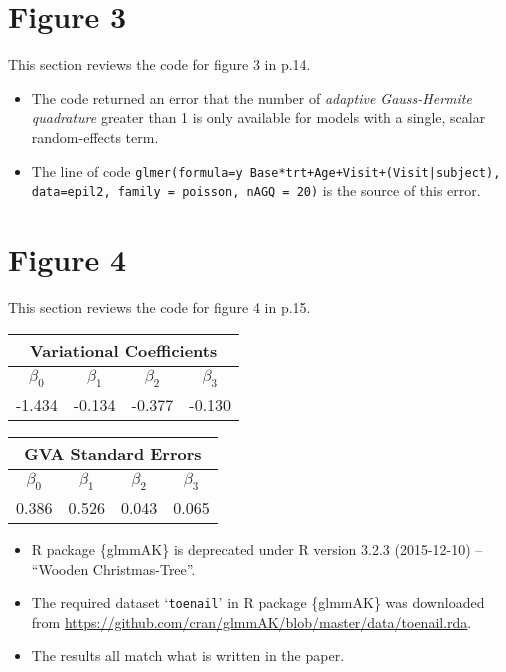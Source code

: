 \documentclass[11pt]{article}
\begin{document}
\section{Figure 3}
This section reviews the code for figure 3 in p.14.
\begin{itemize}
  \item The code returned an error that the number of \emph{adaptive Gauss-Hermite quadrature} greater than 1 is only available for models with a single, scalar random-effects term.
  \item The line of code \texttt{glmer(formula=y~Base*trt+Age+Visit+(Visit|subject), data=epil2, family = poisson, nAGQ = 20)} is the source of this error.
\end{itemize}


\section{Figure 4}
This section reviews the code for figure 4 in p.15.
\begin{table}[!htbp]
\centering
  \begin{tabular}{*4c}
    \toprule
    \multicolumn{4}{c}{\textbf{Variational Coefficients}}\\
    \midrule
    $\beta_{0}$ & $\beta_{1}$ & $\beta_{2}$ & $\beta_{3}$\\
      -1.434 & -0.134 & -0.377 & -0.130\\
    \bottomrule
  \end{tabular}
\end{table}
\begin{table}[!htbp]
\centering
  \begin{tabular}{*4c}
    \toprule
    \multicolumn{4}{c}{\textbf{GVA Standard Errors}}\\
    \midrule
    $\beta_{0}$ & $\beta_{1}$ & $\beta_{2}$ & $\beta_{3}$\\
      0.386 & 0.526 & 0.043 & 0.065\\
    \bottomrule
  \end{tabular}
\end{table}
\begin{itemize}
  \item R package \{glmmAK\} is deprecated under R version 3.2.3 (2015-12-10) -- ``Wooden Christmas-Tree''.
  \item The required dataset `\texttt{toenail}' in R package \{glmmAK\} was downloaded from \url{https://github.com/cran/glmmAK/blob/master/data/toenail.rda}.
  \item The results all match what is written in the paper.
\end{itemize}
\end{document}
